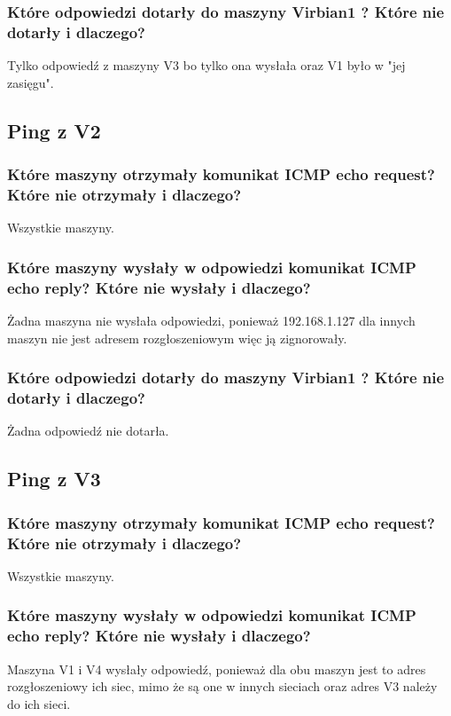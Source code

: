 \documentclass{article}
\begin{document}
\subsubsection{Które odpowiedzi dotarły do maszyny Virbian1 ? Które nie dotarły i dlaczego?}
Tylko odpowiedź z maszyny V3 bo tylko ona wysłała oraz V1 było w "jej zasięgu".

\subsection{Ping z V2}

\subsubsection{Które maszyny otrzymały komunikat ICMP echo request? Które nie otrzymały i dlaczego?}
Wszystkie maszyny.

\subsubsection{Które maszyny wysłały w odpowiedzi komunikat ICMP echo reply? Które nie wysłały i dlaczego?}
Żadna maszyna nie wysłała odpowiedzi, ponieważ 192.168.1.127 dla innych maszyn nie jest adresem rozgłoszeniowym więc ją zignorowały.

\subsubsection{Które odpowiedzi dotarły do maszyny Virbian1 ? Które nie dotarły i dlaczego?}
Żadna odpowiedź nie dotarła.

\subsection{Ping z V3}

\subsubsection{Które maszyny otrzymały komunikat ICMP echo request? Które nie otrzymały i dlaczego?}
Wszystkie maszyny.

\subsubsection{Które maszyny wysłały w odpowiedzi komunikat ICMP echo reply? Które nie wysłały i dlaczego?}
Maszyna V1 i V4 wysłały odpowiedź, ponieważ dla obu maszyn jest to adres rozgłoszeniowy ich siec, mimo że są one w innych sieciach oraz adres V3 należy do ich sieci.
\end{document}
